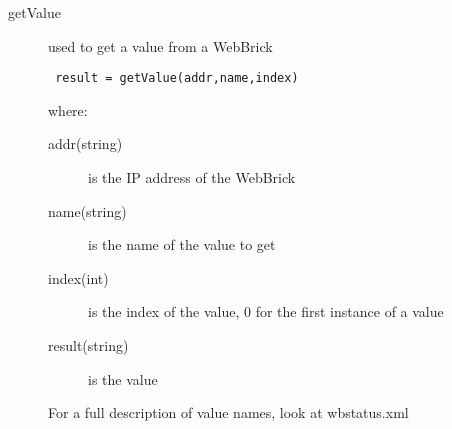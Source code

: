 \begin{description}
	\item[getValue] used to get a value from a WebBrick
		\begin{verbatim} result = getValue(addr,name,index) \end{verbatim}
		where:
		\begin{description}
			\item[addr(string)] is the IP address of the WebBrick
			\item[name(string)] is the name of the value to get
			\item[index(int)] is the index of the value, 0 for the first instance of a value
			\item[result(string)] is the value
		\end{description}
			For a full description of value names, look at wbstatus.xml 
		
\end{description}
